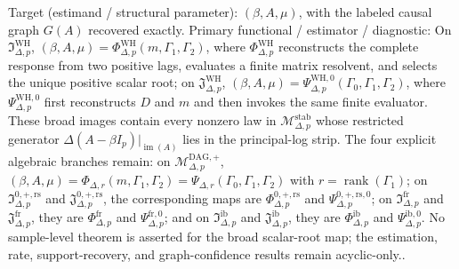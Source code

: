 \documentclass{article}
\begin{document}
Target (estimand / structural parameter): \((\beta,A,\mu)\), with the labeled causal graph \(G(A)\) recovered exactly.
Primary functional / estimator / diagnostic: On \(\mathfrak I_{\Delta,p}^{\mathrm{WH}}\), \((\beta,A,\mu)=\Phi_{\Delta,p}^{\mathrm{WH}}(m,\Gamma_1,\Gamma_2)\), where \(\Phi_{\Delta,p}^{\mathrm{WH}}\) reconstructs the complete response from two positive lags, evaluates a finite matrix resolvent, and selects the unique positive scalar root; on \(\mathfrak J_{\Delta,p}^{\mathrm{WH}}\), \((\beta,A,\mu)=\Psi_{\Delta,p}^{\mathrm{WH},0}(\Gamma_0,\Gamma_1,\Gamma_2)\), where \(\Psi_{\Delta,p}^{\mathrm{WH},0}\) first reconstructs \(D\) and \(m\) and then invokes the same finite evaluator. These broad images contain every nonzero law in \(\mathcal M_{\Delta,p}^{\mathrm{stab}}\) whose restricted generator \(\Delta(A-\beta I_p)|_{\operatorname{im}(A)}\) lies in the principal-log strip. The four explicit algebraic branches remain: on \(\mathcal M_{\Delta,p}^{\mathrm{DAG},+}\), \((\beta,A,\mu)=\Phi_{\Delta,r}(m,\Gamma_1,\Gamma_2)=\Psi_{\Delta,r}(\Gamma_0,\Gamma_1,\Gamma_2)\) with \(r=\operatorname{rank}(\Gamma_1)\); on \(\mathfrak I_{\Delta,p}^{0,+,\mathrm{rs}}\) and \(\mathfrak J_{\Delta,p}^{0,+,\mathrm{rs}}\), the corresponding maps are \(\Phi_{\Delta,p}^{0,+,\mathrm{rs}}\) and \(\Psi_{\Delta,p}^{0,+,\mathrm{rs},0}\); on \(\mathfrak I_{\Delta,p}^{\mathrm{fr}}\) and \(\mathfrak J_{\Delta,p}^{\mathrm{fr}}\), they are \(\Phi_{\Delta,p}^{\mathrm{fr}}\) and \(\Psi_{\Delta,p}^{\mathrm{fr},0}\); and on \(\mathfrak I_{\Delta,p}^{\mathrm{ib}}\) and \(\mathfrak J_{\Delta,p}^{\mathrm{ib}}\), they are \(\Phi_{\Delta,p}^{\mathrm{ib}}\) and \(\Psi_{\Delta,p}^{\mathrm{ib},0}\). No sample-level theorem is asserted for the broad scalar-root map; the estimation, rate, support-recovery, and graph-confidence results remain acyclic-only..
\end{document}
